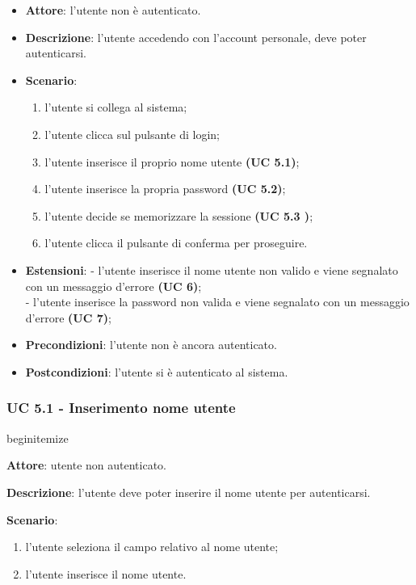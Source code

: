 \begin{itemize}
    \item \textbf{Attore}: l’utente non è autenticato.
    \item \textbf{Descrizione}: l’utente accedendo con l’account personale, deve poter autenticarsi.
    \item \textbf{Scenario}:
    \begin{enumerate}
        \item l’utente si collega al sistema;
        \item l’utente clicca sul pulsante di login;
        \item l’utente inserisce il proprio nome utente \textbf{(UC 5.1)};
        \item l’utente inserisce la propria password \textbf{(UC 5.2)};
        \item l’utente decide se memorizzare la sessione \textbf{(UC 5.3 )};
        \item l’utente clicca il pulsante di conferma per proseguire.
    \end{enumerate}
    \item \textbf{Estensioni}:
        - l’utente inserisce il nome utente non valido e viene segnalato con un messaggio d’errore \textbf{(UC 6)};\\
        - l’utente inserisce la password non valida e viene segnalato con un messaggio d’errore \textbf{(UC 7)};\\

    \item \textbf{Precondizioni}: l’utente non è ancora autenticato.
    \item \textbf{Postcondizioni}: l’utente si è autenticato al sistema.
\end{itemize}

\subsubsection{UC 5.1 - Inserimento nome utente}
begin{itemize}
    \item \textbf{Attore}: utente non autenticato.
    \item \textbf{Descrizione}: l’utente deve poter inserire il nome utente per autenticarsi.
    \item \textbf{Scenario}:
    \begin{enumerate}
        \item l’utente seleziona il campo relativo al nome utente;
        \item l’utente inserisce il nome utente.
    \end{enumerate}

